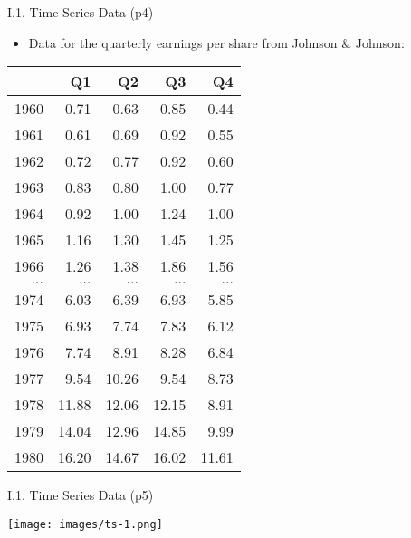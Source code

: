 \documentclass[handout]{beamer}
\begin{document}
\begin{frame}{I.1. Time Series Data (p4)}
\begin{itemize}
\item Data for the quarterly earnings per share from Johnson \& Johnson: 
\end{itemize}
\begin{center}
{\small
\begin{tabular}{rrrrr}
  \hline
 & Q1 & Q2 & Q3 & Q4 \\ 
  \hline
1960 & 0.71 & 0.63 & 0.85 & 0.44 \\ 
  1961 & 0.61 & 0.69 & 0.92 & 0.55 \\ 
  1962 & 0.72 & 0.77 & 0.92 & 0.60 \\ 
  1963 & 0.83 & 0.80 & 1.00 & 0.77 \\ 
  1964 & 0.92 & 1.00 & 1.24 & 1.00 \\ 
  1965 & 1.16 & 1.30 & 1.45 & 1.25 \\ 
  1966 & 1.26 & 1.38 & 1.86 & 1.56 \\ 
$\dots$ &  $\dots$ & $\dots$ & $\dots$ & $\dots$ \\
  1974 & 6.03 & 6.39 & 6.93 & 5.85 \\ 
  1975 & 6.93 & 7.74 & 7.83 & 6.12 \\ 
  1976 & 7.74 & 8.91 & 8.28 & 6.84 \\ 
  1977 & 9.54 & 10.26 & 9.54 & 8.73 \\ 
  1978 & 11.88 & 12.06 & 12.15 & 8.91 \\ 
  1979 & 14.04 & 12.96 & 14.85 & 9.99 \\ 
  1980 & 16.20 & 14.67 & 16.02 & 11.61 \\ 
   \hline
\end{tabular}
}
\end{center}
\end{frame}
\begin{frame}{I.1. Time Series Data (p5)}
\begin{center}
\texttt{[image: images/ts-1.png]}
\end{center}
\end{frame}
\end{document}
